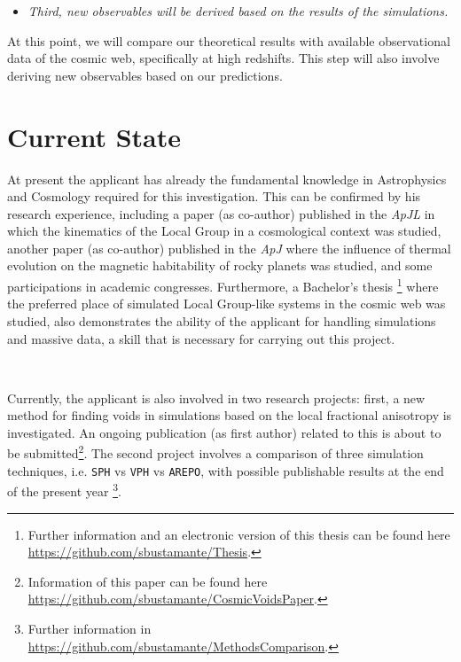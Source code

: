 \documentclass[a4,useAMS,usenatbib,usegraphicx,12pt]{article}
\begin{document}
\begin{itemize}

\item[\checkmark] \textit{Third, new observables will be derived based on the
results of the simulations. }

\end{itemize}


At this point, we will compare our theoretical results with available 
observational data of the cosmic web, specifically at high redshifts. This step 
will also involve deriving new observables based on our predictions.


\section{Current State}


At present the applicant has already the fundamental knowledge in Astrophysics and
Cosmology required for this investigation. This can be confirmed by his research
experience, including a paper (as co-author) published in the \textit{ApJL} in 
which the kinematics of the Local Group in a cosmological context was studied, 
another paper (as co-author) published in the \textit{ApJ} where the influence of 
thermal evolution on the magnetic habitability of rocky planets was studied,
and some participations in academic congresses. Furthermore, a Bachelor's thesis
\footnote{\scriptsize Further information and an electronic version of this 
thesis can be found here \url{https://github.com/sbustamante/Thesis}.} where the 
preferred place of simulated Local Group-like systems in the cosmic 
web was studied, also demonstrates the ability of the applicant for handling 
simulations and massive data, a skill that is necessary for carrying out this project.

\

Currently, the applicant is also involved in two research projects: first, a 
new method for finding voids in simulations based on the local fractional 
anisotropy is investigated. An ongoing publication (as first author) related to this is about 
to be submitted\footnote{\scriptsize Information of this paper can be found 
here \url{https://github.com/sbustamante/CosmicVoidsPaper}.}. The second project
involves a comparison of three simulation techniques, i.e. \texttt{SPH} vs 
\texttt{VPH} vs \texttt{AREPO}, with possible publishable results at the end of
the present year \footnote{\scriptsize Further information in  
\url{https://github.com/sbustamante/MethodsComparison}.}.
\end{document}
